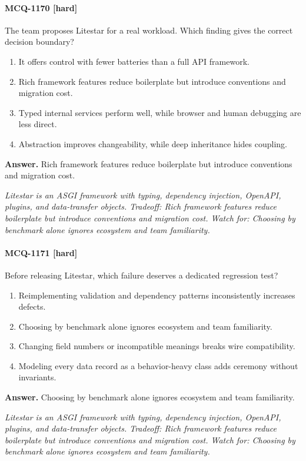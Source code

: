 \paragraph{MCQ-1170 [hard]} The team proposes Litestar for a real workload. Which finding gives the correct decision boundary?
\begin{enumerate}[label=\Alph*.]
\item It offers control with fewer batteries than a full API framework.
\item Rich framework features reduce boilerplate but introduce conventions and migration cost.
\item Typed internal services perform well, while browser and human debugging are less direct.
\item Abstraction improves changeability, while deep inheritance hides coupling.
\end{enumerate}
\noindent\textbf{Answer.} Rich framework features reduce boilerplate but introduce conventions and migration cost.
\par\textit{Litestar is an ASGI framework with typing, dependency injection, OpenAPI, plugins, and data-transfer objects. Tradeoff: Rich framework features reduce boilerplate but introduce conventions and migration cost. Watch for: Choosing by benchmark alone ignores ecosystem and team familiarity.}
\paragraph{MCQ-1171 [hard]} Before releasing Litestar, which failure deserves a dedicated regression test?
\begin{enumerate}[label=\Alph*.]
\item Reimplementing validation and dependency patterns inconsistently increases defects.
\item Choosing by benchmark alone ignores ecosystem and team familiarity.
\item Changing field numbers or incompatible meanings breaks wire compatibility.
\item Modeling every data record as a behavior-heavy class adds ceremony without invariants.
\end{enumerate}
\noindent\textbf{Answer.} Choosing by benchmark alone ignores ecosystem and team familiarity.
\par\textit{Litestar is an ASGI framework with typing, dependency injection, OpenAPI, plugins, and data-transfer objects. Tradeoff: Rich framework features reduce boilerplate but introduce conventions and migration cost. Watch for: Choosing by benchmark alone ignores ecosystem and team familiarity.}
